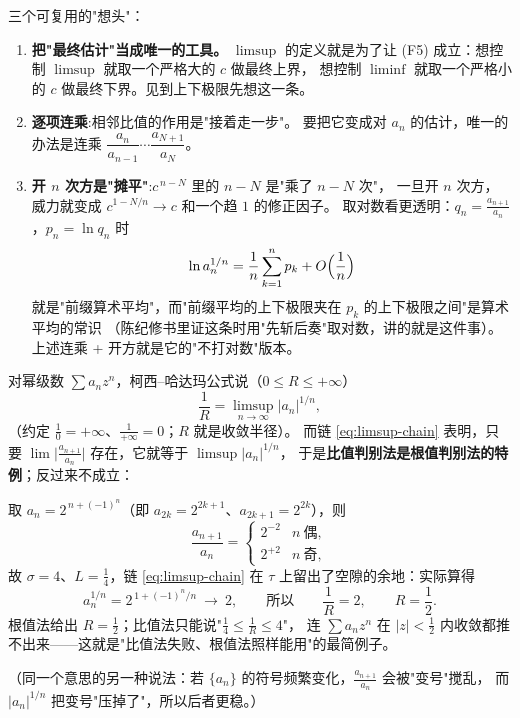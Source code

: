 \begin{remark}\label{rem:why-chain}
三个可复用的"想头"：
\begin{enumerate}[label=(\arabic*), leftmargin=2.2em]
\item \textbf{把"最终估计"当成唯一的工具。}
$\limsup$ 的定义就是为了让 (F5) 成立：想控制 $\limsup$ 就取一个严格大的 $c$ 做最终上界，
想控制 $\liminf$ 就取一个严格小的 $c$ 做最终下界。见到上下极限先想这一条。
\item \textbf{逐项连乘}:相邻比值的作用是"接着走一步"。
要把它变成对 $a_n$ 的估计，唯一的办法是连乘 $\dfrac{a_{n}}{a_{n-1}}\cdots\dfrac{a_{N+1}}{a_N}$。
\item \textbf{开 $n$ 次方是"摊平"}:$c^{\,n-N}$ 里的 $n-N$ 是"乘了 $n-N$ 次"，
一旦开 $n$ 次方，威力就变成 $c^{1-N/n}\to c$ 和一个趋 $1$ 的修正因子。
取对数看更透明：$q_n=\frac{a_{n+1}}{a_n}$，$p_n=\ln q_n$ 时
\[
\ln a_n^{1/n}=\frac{1}{n}\sum_{k=1}^{n}p_k+O\Bigl(\frac1n\Bigr)
\]
就是"前缀算术平均"，而"前缀平均的上下极限夹在 $p_k$ 的上下极限之间"是算术平均的常识
（陈纪修书里证这条时用"先斩后奏"取对数，讲的就是这件事）。上述连乘 + 开方就是它的"不打对数"版本。
\end{enumerate}
\end{remark}

\begin{remark}\label{rem:root-vs-ratio}
对幂级数 $\sum a_nz^n$，柯西--哈达玛公式说（$0\le R\le+\infty$）
\[
\frac1R=\limsup_{n\to\infty}|a_n|^{1/n},
\]
（约定 $\frac10=+\infty$、$\frac1{+\infty}=0$；$R$ 就是收敛半径）。
而链 \eqref{eq:limsup-chain} 表明，只要 $\lim\bigl|\frac{a_{n+1}}{a_n}\bigr|$ 存在，它就等于 $\limsup|a_n|^{1/n}$，
于是\textbf{比值判别法是根值判别法的特例}；反过来不成立：

\begin{example}\label{ex:ratio-fails}
取 $a_n=2^{\,n+(-1)^n}$（即 $a_{2k}=2^{2k+1}$、$a_{2k+1}=2^{2k}$），则
\[
\frac{a_{n+1}}{a_n}=
\begin{cases}
2^{-2} & n\ \text{偶},\\[2pt]
2^{+2} & n\ \text{奇},
\end{cases}
\]
故 $\sigma=4$、$L=\frac14$，链 \eqref{eq:limsup-chain} 在 $\tau$ 上留出了空隙的余地：实际算得
\[
a_n^{1/n}=2^{\,1+(-1)^n/n}\ \longrightarrow\ 2,
\qquad\text{所以}\qquad
\frac1R=2,\qquad R=\frac12 .
\]
根值法给出 $R=\frac12$；比值法只能说"$\frac14\le\frac1R\le4$"，
连 $\sum a_nz^n$ 在 $|z|<\frac12$ 内收敛都推不出来——这就是"比值法失败、根值法照样能用"的最简例子。
\end{example}
（同一个意思的另一种说法：若 $\{a_n\}$ 的符号频繁变化，$\frac{a_{n+1}}{a_n}$ 会被"变号"搅乱，
而 $|a_n|^{1/n}$ 把变号"压掉了"，所以后者更稳。）

\end{remark}
